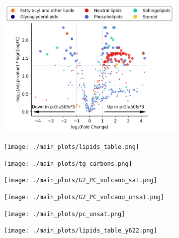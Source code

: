 \documentclass[12pt]{article}
\begin{document}
\begin{figure}[H]
    \begin{subfigure}[t]{.3\textwidth}
        \caption{}
        \includegraphics[width=\textwidth]{./main_plots/iN_lipids_overview.png}        
    \end{subfigure} 
    \begin{subfigure}[t]{.3\textwidth}
        \caption{}
        \texttt{[image: ./main\_plots/lipids\_table.png]}        
    \end{subfigure} 
    \begin{subfigure}[t]{.3\textwidth}
        \caption{}
        \texttt{[image: ./main\_plots/tg\_carbons.png]}        
    \end{subfigure} 
    \begin{subfigure}[t]{.3\textwidth}
        \caption{}
        \texttt{[image: ./main\_plots/G2\_PC\_volcano\_sat.png]}        
    \end{subfigure} 
    \begin{subfigure}[t]{.3\textwidth}
        \caption{}
        \texttt{[image: ./main\_plots/G2\_PC\_volcano\_unsat.png]}        
    \end{subfigure} 
    \begin{subfigure}[t]{.3\textwidth}
        \caption{}
        \texttt{[image: ./main\_plots/pc\_unsat.png]}        
    \end{subfigure} 
    \begin{subfigure}[t]{.3\textwidth}
        \caption{}
        \texttt{[image: ./main\_plots/lipids\_table\_y622.png]}        
    \end{subfigure}

\end{figure}
\end{document}
